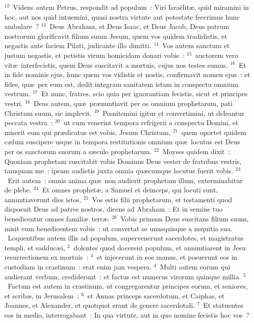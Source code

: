 ${}^{12}$~Videns autem Petrus, respondit ad populum~: Viri Isra\"elit\ae , quid miramini in hoc, aut nos quid intuemini, quasi nostra virtute aut potestate fecerimus hunc ambulare~?
${}^{13}$~Deus Abraham, et Deus Isaac, et Deus Jacob, Deus patrum nostrorum glorificavit filium suum Jesum, quem vos quidem tradidistis, et negastis ante faciem Pilati, judicante illo dimitti.
${}^{14}$~Vos autem sanctum et justum negastis, et petistis virum homicidam donari vobis~:
${}^{15}$~auctorem vero vit\ae\ interfecistis, quem Deus suscitavit a mortuis, cujus nos testes sumus.
${}^{16}$~Et in fide nominis ejus, hunc quem vos vidistis et nostis, confirmavit nomen ejus~: et fides, qu\ae\ per eum est, dedit integram sanitatem istam in conspectu omnium vestrum.
${}^{17}$~Et nunc, fratres, scio quia per ignorantiam fecistis, sicut et principes vestri.
${}^{18}$~Deus autem, qu\ae\ pr\ae nuntiavit per os omnium prophetarum, pati Christum suum, sic implevit.
${}^{19}$~Pœnitemini igitur et convertimini, ut deleantur peccata vestra~:
${}^{20}$~ut cum venerint tempora refrigerii a conspectu Domini, et miserit eum qui pr\ae dicatus est vobis, Jesum Christum,
${}^{21}$~quem oportet quidem c\ae lum suscipere usque in tempora restitutionis omnium qu\ae\ locutus est Deus per os sanctorum suorum a s\ae culo prophetarum.
${}^{22}$~Moyses quidem dixit~: Quoniam prophetam suscitabit vobis Dominus Deus vester de fratribus vestris, tamquam me~: ipsum audietis juxta omnia qu\ae cumque locutus fuerit vobis.
${}^{23}$~Erit autem~: omnis anima qu\ae\ non audierit prophetam illum, exterminabitur de plebe.
${}^{24}$~Et omnes prophet\ae , a Samuel et deinceps, qui locuti sunt, annuntiaverunt dies istos.
${}^{25}$~Vos estis filii prophetarum, et testamenti quod disposuit Deus ad patres nostros, dicens ad Abraham~: Et in semine tuo benedicentur omnes famili\ae\ terr\ae .
${}^{26}$~Vobis primum Deus suscitans filium suum, misit eum benedicentem vobis~: ut convertat se unusquisque a nequitia sua.
~Loquentibus autem illis ad populum, supervenerunt sacerdotes, et magistratus templi, et sadduc\ae i,
${}^{2}$~dolentes quod docerent populum, et annuntiarent in Jesu resurrectionem ex mortuis~:
${}^{3}$~et injecerunt in eos manus, et posuerunt eos in custodiam in crastinum~: erat enim jam vespera.
${}^{4}$~Multi autem eorum qui audierant verbum, crediderunt~: et factus est numerus virorum quinque millia.
${}^{5}$~Factum est autem in crastinum, ut congregarentur principes eorum, et seniores, et scrib\ae , in Jerusalem~:
${}^{6}$~et Annas princeps sacerdotum, et Caiphas, et Joannes, et Alexander, et quotquot erant de genere sacerdotali.
${}^{7}$~Et statuentes eos in medio, interrogabant~: In qua virtute, aut in quo nomine fecistis hoc vos~?


